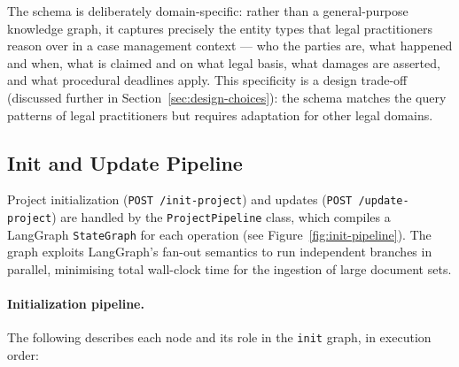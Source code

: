 The schema is deliberately domain-specific: rather than a general-purpose knowledge graph, it captures precisely the entity types that legal practitioners reason over in a case management context --- who the parties are, what happened and when, what is claimed and on what legal basis, what damages are asserted, and what procedural deadlines apply. This specificity is a design trade-off (discussed further in Section~\ref{sec:design-choices}): the schema matches the query patterns of legal practitioners but requires adaptation for other legal domains.

\subsection{Init and Update Pipeline}

Project initialization (\texttt{POST /init-project}) and updates (\texttt{POST /update-project}) are handled by the \texttt{ProjectPipeline} class, which compiles a LangGraph \texttt{StateGraph} for each operation (see Figure~\ref{fig:init-pipeline}). The graph exploits LangGraph's fan-out semantics to run independent branches in parallel, minimising total wall-clock time for the ingestion of large document sets.

\paragraph{Initialization pipeline.}
The following describes each node and its role in the \texttt{init} graph, in execution order:

